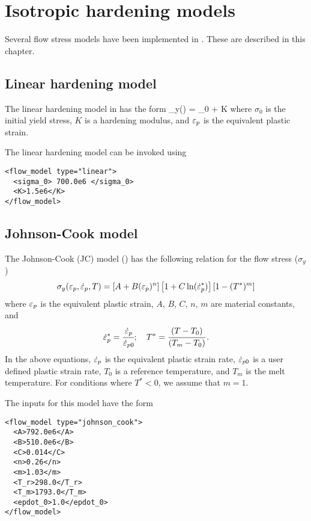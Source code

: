 \chapter{Isotropic hardening models}
Several flow stress models have been implemented in \Vaango.  These are described in this chapter.

\section{Linear hardening model}
The linear hardening model in \Vaango has the form
\Beq
  \sigma_y(\Ep) = \sigma_0 + K \Ep
\Eeq
where $\sigma_0$ is the initial yield stress, $K$ is a hardening modulus, and
$\varepsilon_p$ is the equivalent plastic strain.

The linear hardening model can be invoked using
\lstset{language=XML}
\begin{lstlisting}
<flow_model type="linear">
  <sigma_0> 700.0e6 </sigma_0>
  <K>1.5e6</K>
</flow_model>
\end{lstlisting}

\section{Johnson-Cook model}
The Johnson-Cook (JC) model (\cite{Johnson1983}) has
the following relation for the flow stress ($\sigma_y$) 
\begin{equation}
  \sigma_y(\varepsilon_p,\dot{\varepsilon}_{p},T) = 
  \left[A + B (\varepsilon_p)^n\right]\left[1 + C \ln(\dot{\varepsilon}_{p}^{*})\right]
  \left[1 - (T^*)^m\right]
\end{equation}
where $\varepsilon_p$ is the equivalent plastic strain, 
$A$, $B$, $C$, $n$, $m$ are material constants, and
\begin{equation}
  \dot{\varepsilon}_{p}^{*} = \cfrac{\dot{\varepsilon}_{p}}{\dot{\varepsilon}_{p0}}; \quad
  T^* = \cfrac{(T-T_0)}{(T_m-T_0)}\,.
\end{equation}
In the above equations, $\dot{\varepsilon}_{p}$ is the 
equivalent plastic strain rate, 
$\dot{\varepsilon}_{p0}$ is a user defined plastic strain rate, 
$T_0$ is a reference temperature, and $T_m$ is the melt temperature.  
For conditions where $T^* < 0$, we assume that $m = 1$.

The inputs for this model have the form
\lstset{language=XML}
\begin{lstlisting}
<flow_model type="johnson_cook">
  <A>792.0e6</A>
  <B>510.0e6</B>
  <C>0.014</C>
  <n>0.26</n>
  <m>1.03</m>
  <T_r>298.0</T_r>
  <T_m>1793.0</T_m>
  <epdot_0>1.0</epdot_0>
</flow_model>
\end{lstlisting}

